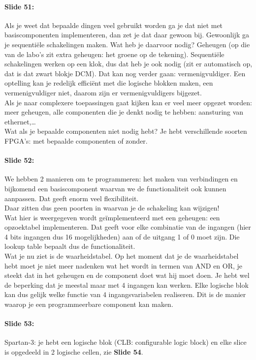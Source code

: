 \documentclass[10pt,a4paper]{book}
\begin{document}
\paragraph{Slide 51:} Als je weet dat bepaalde dingen veel gebruikt worden ga je dat niet met basiscomponenten implementeren, dan zet je dat daar gewoon bij. Gewoonlijk ga je sequenti\"ele schakelingen maken. Wat heb je daarvoor nodig? Geheugen (op die van de labo's zit extra geheugen: het groene op de tekening). Sequenti\"ele schakelingen werken op een klok, dus dat heb je ook nodig (zit er automatisch op, dat is dat zwart blokje DCM). Dat kan nog verder gaan: vermenigvuldiger. Een optelling kan je redelijk effici\"ent met die logische blokken maken, een vermenigvuldiger niet, daarom zijn er vermenigvuldigers bijgezet.\\
Als je naar complexere toepassingen gaat kijken kan er veel meer opgezet worden: meer geheugen, alle componenten die je denkt nodig te hebben: aansturing van ethernet,\ldots \\
Wat als je bepaalde componenten niet nodig hebt? Je hebt verschillende soorten FPGA's: met bepaalde componenten of zonder. 

\paragraph{Slide 52:} We hebben 2 manieren om te programmeren: het maken van verbindingen en bijkomend een basiscomponent waarvan we de functionaliteit ook kunnen aanpassen. Dat geeft enorm veel flexibiliteit.\\
Daar zitten dus geen poorten in waarvan je de schakeling kan wijzigen!\\
Wat hier is weergegeven wordt ge\"implementeerd met een geheugen: een opzoektabel implementeren. Dat geeft voor elke combinatie van de ingangen (hier 4 bits ingangen dus 16 mogelijkheden) aan of de uitgang 1 of 0 moet zijn. Die lookup table bepaalt dus de functionaliteit.\\
Wat je nu ziet is de waarheidstabel. Op het moment dat je de waarheidstabel hebt moet je niet meer nadenken wat het wordt in termen van AND en OR, je steekt dat in het geheugen en de component doet wat hij moet doen. Je hebt wel de beperking dat je meestal maar met 4 ingangen kan werken. Elke logische blok kan dus gelijk welke functie van 4 ingangsvariabelen realiseren.
Dit is de manier waarop je een programmeerbare component kan maken.

\paragraph{Slide 53:} Spartan-3: je hebt een logische blok (CLB: configurable logic block) en elke slice is opgedeeld in 2 logische cellen, zie \textbf{Slide 54}.
\end{document}
